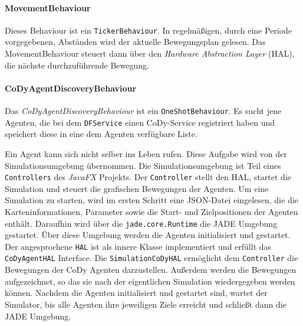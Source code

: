 \paragraph{MovementBehaviour}
Dieses Behaviour ist ein \texttt{TickerBehaviour}. In regelmäßigen, durch eine Periode vorgegebenen, Abständen wird der aktuelle Bewegungsplan gelesen. Das MovementBehaviour steuert dann über den \textit{Hardware Abstraction Layer} (HAL), die nächste durchzuführende Bewegung. 

\paragraph{CoDyAgentDiscoveryBehaviour}
Das \textit{CoDyAgentDiscoveryBehaviour} ist ein \texttt{OneShotBehaviour}. Es sucht jene Agenten, die bei dem \texttt{DFService} einen CoDy-Service registriert haben und speichert diese in eine dem Agenten verfügbare Liste.

Ein Agent kann sich nicht selber ins Leben rufen. Diese Aufgabe wird von der Simulationsumgebung übernommen. Die Simulationsumgebung ist Teil eines \texttt{Controllers} des \textit{JavaFX} Projekts. Der \texttt{Controller} stellt den HAL, startet die Simulation und steuert die grafischen Bewegungen der Agenten. Um eine Simulation zu starten, wird im ersten Schritt eine JSON-Datei eingelesen, die die Karteninformationen, Parameter sowie die Start- und Zielpositionen der Agenten enthält. Daraufhin wird über die \texttt{jade.core.Runtime} die JADE Umgebung gestartet. Über diese Umgebung werden die Agenten initialisiert und gestartet. 
Der angesprochene \texttt{HAL} ist als innere Klasse implementiert und erfüllt das \texttt{CoDyAgentHAL} Interface. Die \texttt{SimulationCoDyHAL} ermöglicht dem \texttt{Controller} die Bewegungen der CoDy Agenten darzustellen. Außerdem werden die Bewegungen aufgezeichnet, so das sie nach der eigentlichen Simulation wiedergegeben werden können. Nachdem die Agenten initialisiert und gestartet sind, wartet der Simulator, bis alle Agenten ihre jeweiligen Ziele erreicht und schließt dann die JADE Umgebung. 
